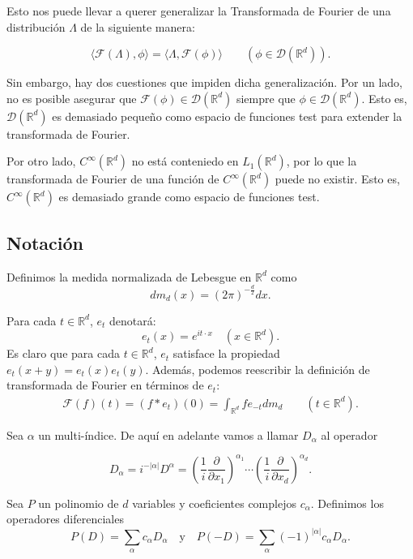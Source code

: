 Esto nos puede llevar a querer generalizar la Transformada de Fourier de una distribución $\Lambda$ de la siguiente manera: 

$$ \langle \mathcal{F}(\Lambda),\phi\rangle = \langle\Lambda,\mathcal{F}(\phi)\rangle\qquad (\phi\in\mathcal{D}(\mathbb{R}^{d})).$$

Sin embargo, hay dos cuestiones que impiden dicha generalización. Por un lado, no es posible asegurar que $\mathcal{F}(\phi)\in\mathcal{D}(\mathds{R}^{d})$ siempre que $\phi\in\mathcal{D}(\mathds{R}^{d})$. Esto es, $\mathcal{D}(\mathds{R}^{d})$ es demasiado pequeño como espacio de funciones test para extender la transformada de Fourier.

Por otro lado, $C^{\infty}(\mathds{R}^{d})$ no está conteniedo en $L_{1}(\mathds{R}^{d})$, por lo que la transformada de Fourier de una función de  $C^{\infty}(\mathds{R}^{d})$ puede no existir. Esto es,  $C^{\infty}(\mathds{R}^{d})$ es demasiado grande como espacio de funciones test.

\subsection{Notación}
\begin{definicion}
Definimos la medida normalizada de Lebesgue en $\mathds{R}^{d}$ como
\begin{equation}
dm_{d}(x) = (2\pi)^{-\frac{d}{2}}dx.
\end{equation}
\end{definicion}
\begin{definicion}
Para cada $t\in\mathds{R}^{d}$, $e_{t}$ denotará:
\begin{equation}
e_{t}(x) = e^{it\cdot x} \quad (x\in\mathds{R}^{d}).
\end{equation}
Es claro que para cada $t\in\mathds{R}^{d}$,  $e_{t}$ satisface la propiedad $e_{t}(x+y) = e_{t}(x)e_{t}(y)$. Además, podemos reescribir la definición de transformada de Fourier en términos de $e_{t}$:
\begin{align*}
\mathcal{F}(f)(t) = (f*e_{t})(0) = \int_{\mathds{R}^{d}} f e_{-t} dm_{d}  \qquad (t\in\mathds{R}^{d}).
\end{align*}
\end{definicion}
\begin{definicion}
Sea $\alpha$ un multi-índice. De aquí en adelante vamos a llamar $D_{\alpha}$ al operador 

\begin{equation}
D_{\alpha} = i^{-\vert\alpha\vert}D^{\alpha} = \left( \frac{1}{i}\frac{\partial}{\partial x_{1}}\right)^{\alpha_{1}} \cdots \left( \frac{1}{i}\frac{\partial}{\partial x_{d}} \right)^{\alpha_{d}}.
\end{equation}

Sea $P$ un polinomio de $d$ variables y coeficientes complejos $c_{\alpha}$. Definimos los operadores diferenciales 
\begin{equation}
P(D)=\sum_{\alpha} c_{\alpha}D_{\alpha} \quad \text{y} \quad  P(-D)= \sum_{\alpha} (-1)^{\vert\alpha\vert}c_{\alpha}D_{\alpha}.
\end{equation}
\end{definicion}


